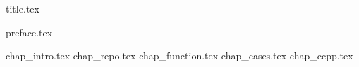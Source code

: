 \documentclass[12pt,letterpaper,oneside]{scrbook}
\begin{document}
\frontmatter
{title.tex}
 
\tableofcontents

{preface.tex}

\mainmatter

{chap_intro.tex}
{chap_repo.tex}
{chap_function.tex}
{chap_cases.tex}
{chap_ccpp.tex}
\backmatter
\end{document}
